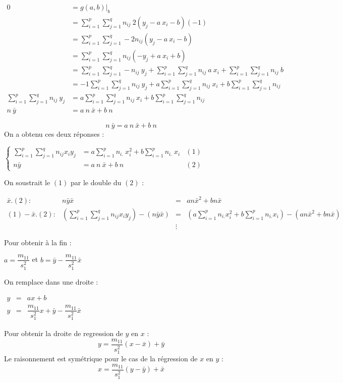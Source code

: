 \begin{center}
	$\begin{array}{RL}
		0 &= \left.g(a,b)\right|_b\\
		  &= \sum_{i=1}^{p} \sum_{j=1}^{q} n_{ij}\ 2(y_j - a\ x_i-b)(-1)\\
		  &= \sum_{i=1}^{p} \sum_{j=1}^{q} -2n_{ij}(y_j - a\ x_i - b)\\
		  &= \sum_{i=1}^{p} \sum_{j=1}^{q} n_{ij}(-y_j + a\ x_i + b)\\
		  &= \sum_{i=1}^{p} \sum_{j=1}^{q} -n_{ij}\ y_j + \sum_{i=1}^{p} \sum_{j=1}^{q} n_{ij}\ a\ x_i + \sum_{i=1}^{p} \sum_{j=1}^{q} n_{ij}\ b\\
		  &= -1 \sum_{i=1}^{p} \sum_{j=1}^{q} n_{ij}\ y_j + a \sum_{i=1}^{p} \sum_{j=1}^{q} n_{ij}\ x_i + b \sum_{i=1}^{p} \sum_{j=1}^{q} n_{ij}\\
		\sum_{i=1}^{p} \sum_{j=1}^{q} n_{ij}\ y_j &= a \sum_{i=1}^{p} \sum_{j=1}^{q} n_{ij}\ x_i + b \sum_{i=1}^{p} \sum_{j=1}^{q} n_{ij}\\
		n\ \bar{y} &= a\ n\ \bar{x} + b\ n
	\end{array}$
\end{center}
$$\boxed{n\ \bar{y} = a\ n\ \bar{x} + b\ n}$$
On a obtenu ces deux réponses :
\begin{center}
	$\left\{
	\begin{array}{RLC}
		\sum_{i=1}^{p} \sum_{j=1}^{q}n_{ij}x_iy_j &= a \sum_{i=1}^{p} n_{i.}\ x_i^2 + b \sum_{i=1}^{p} n_{i.}\ x_i &(1)\\
		n\bar{y} &= a\ n\ \bar{x} + b\ n&(2)
	\end{array}
	\right.$
\end{center}
On soustrait le $(1)$ par le double du $(2)$ :
\begin{center}
	$\begin{array}{RRCL}
		\bar{x}.(2) :& n\bar{y}\bar{x} &=& an\bar{x}^2 + bn\bar{x}\\
		(1) - \bar{x}.(2) :& \left(\sum_{i=1}^{p} \sum_{j=1}^{q} n_{ij}x_iy_j \right) - ( n\bar{y}\bar{x} ) &=& \left( a \sum_{i=1}^{p} n_{i.}x_i^2 + b\sum_{i=1}^{p} n_{i.}x_i \right) - \left( an\bar{x}^2 + bn\bar{x} \right)\\
        &&\vdots&
	\end{array}$
\end{center}
Pour obtenir à la fin :
\begin{center}
	$\boxed{a = \dfrac{m_{11}}{s_1^2}}$ et $\boxed{b = \bar{y} - \dfrac{m_{11}}{s_1^2} \bar{x}} $
\end{center}
On remplace dans une droite :
\begin{center}
	$\begin{array}{RRL}
		y&=&ax+b\\
		y&=&\dfrac{m_{11}}{s_1^2}x+\bar{y} - \dfrac{m_{11}}{s_1^2} \bar{x}
	\end{array}$
\end{center}
Pour obtenir la droite de regression de $y$ en $x$ :
$$\boxed{y = \dfrac{m_{11}}{s_1^2} (x - \bar{x}) + \bar{y}}$$
Le raisonnement est symétrique pour le cas de la régression de $x$ en $y$ :
$$\boxed{x = \dfrac{m_{11}}{s_1^2} (y - \bar{y}) + \bar{x}}$$





